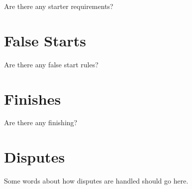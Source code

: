 \begin{framed}
Are there any starter requirements?
\end{framed}

\section{False Starts}

\begin{framed}
Are there any false start rules?
\end{framed}

\section{Finishes}

\begin{framed}
Are there any finishing?
\end{framed}

\section{Disputes}

\begin{framed}
Some words about how disputes are handled should go here.
\end{framed}

